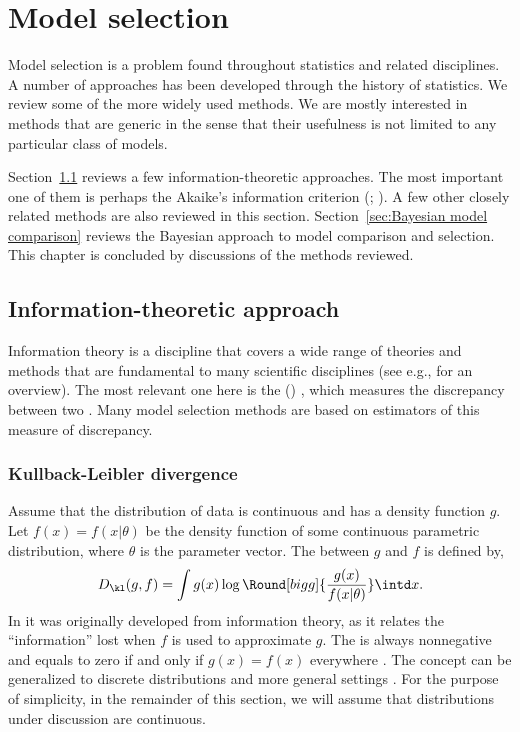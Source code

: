 \chapter{Model selection}
\label{cha:Model selection}

Model selection is a problem found throughout statistics and related disciplines. A number of approaches has been developed through the history of statistics. We review some of the more widely used methods. We are mostly interested in methods that are generic in the sense that their usefulness is not limited to any particular class of models.

Section~\ref{sec:Information theoretic approach} reviews a few information-theoretic approaches. The most important one of them is perhaps the Akaike's information criterion (\aic; \cite{Akaike:1973uc,Akaike:1974ih}). A few other closely related methods are also reviewed in this section. Section~\ref{sec:Bayesian model comparison} reviews the Bayesian approach to model comparison and selection. This chapter is concluded by discussions of the methods reviewed.

\section{Information-theoretic approach}
\label{sec:Information theoretic approach}

Information theory is a discipline that covers a wide range of theories and methods that are fundamental to many scientific disciplines (see e.g., \cite{Cover:1991vx} for an overview). The most relevant one here is the \kldfull (\kld) \cite{Kullback:1951va}, which measures the discrepancy between two . Many model selection methods are based on estimators of this measure of discrepancy.

\subsection{Kullback-Leibler divergence}
\label{sub:Kullback-Liebler divergence}

Assume that the distribution of data is continuous and has a density function $g$. Let $f(x) = f(x|\theta)$ be the density function of some continuous parametric distribution, where $\theta$ is the parameter vector. The \kld between $g$ and $f$ is defined by,
\begin{equation}
  D_{\kl}(g,f) = \int g(x)\log\Round[bigg]{\frac{g(x)}{f(x|\theta)}}\intd x.
  \label{eq:kl}
\end{equation}
In \cite{Kullback:1951va} it was originally developed from information theory, as it relates the ``information'' lost when $f$ is used to approximate $g$. The \kld is always nonnegative and equals to zero if and only if $g(x) = f(x)$ everywhere \cite[][sec.~6.8]{Burnham:2002wc}. The concept can be generalized to discrete distributions and more general settings \cite[][sec.~2.1.3]{Burnham:2002wc}. For the purpose of simplicity, in the remainder of this section, we will assume that distributions under discussion are continuous.

